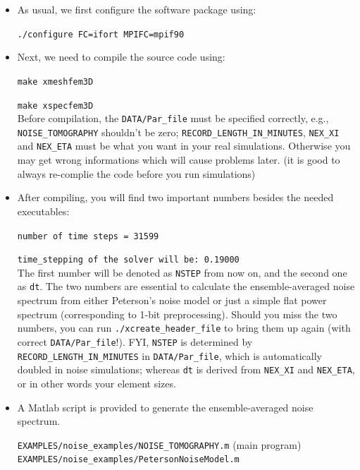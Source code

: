 \documentclass[oneside,english]{book}
\begin{document}
\begin{itemize}

\item
As usual, we first configure the software package using:

\texttt{./configure FC=ifort MPIFC=mpif90} \\

\item
Next, we need to compile the source code using:

\texttt{make xmeshfem3D}

\texttt{make xspecfem3D} \\

Before compilation, the \texttt{DATA/Par\_file} must be specified correctly, e.g.,
\texttt{NOISE\_TOMOGRAPHY} shouldn't be zero; \texttt{RECORD\_LENGTH\_IN\_MINUTES},
\texttt{NEX\_XI} and \texttt{NEX\_ETA} must be what you want in your real simulations.
Otherwise you may get wrong informations which will cause problems later.
(it is good to always re-complie the code before you run simulations)\\

\item
After compiling, you will find two important numbers besides the needed executables:

\texttt{number of time steps = 31599}

\texttt{time\_stepping of the solver will be: 0.19000}\\

The first number will be denoted as \texttt{NSTEP} from now on, and the second one as \texttt{dt}.
The two numbers are essential to calculate the ensemble-averaged noise spectrum from either Peterson's noise
model or just a simple flat power spectrum (corresponding to 1-bit preprocessing).
Should you miss the two numbers, you can run
\texttt{./xcreate\_header\_file} to bring them up again (with correct \texttt{DATA/Par\_file}!).
FYI, \texttt{NSTEP} is determined by \texttt{RECORD\_LENGTH\_IN\_MINUTES} in \texttt{DATA/Par\_file},
which is automatically doubled in noise simulations; whereas \texttt{dt} is derived from
\texttt{NEX\_XI} and \texttt{NEX\_ETA}, or in other words your element sizes.


\item
A Matlab script is provided to generate the ensemble-averaged noise spectrum.

\texttt{EXAMPLES/noise\_examples/NOISE\_TOMOGRAPHY.m}  (main program)\\
\texttt{EXAMPLES/noise\_examples/PetersonNoiseModel.m}



\end{itemize}
\end{document}
